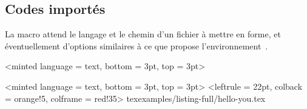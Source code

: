 \documentclass{tutodoc}
\begin{document}
\subsection{Codes importés}

La macro \tdoclatexin{\tdoccodeinput} attend le langage et le chemin d'un fichier à mettre en forme, et éventuellement d'options similaires à ce que propose l'environnement \,. 



\begin{tdocexa}
	\leavevmode
	
    \begin{tdoclatex}<minted language = text, bottom = 3pt, top = 3pt>
    \end{tdoclatex}
\end{tdocexa}



\begin{tdocexa}
	\leavevmode
	
    \begin{tdoclatex}<minted language = text, bottom = 3pt, top = 3pt>
\tdoccodeinput[style = solarized-light, linenos]%
              <leftrule = 22pt, colback = orange!5, colframe = red!35>%
              {tex}{examples/listing-full/hello-you.tex}
    \end{tdoclatex}
\end{tdocexa}
\end{document}
